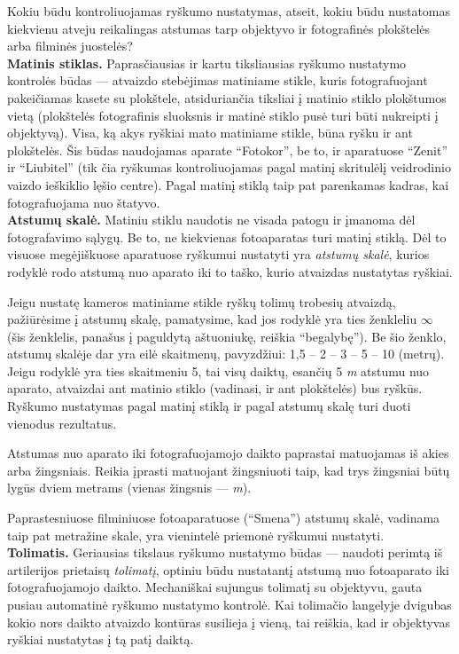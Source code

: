 \documentclass[12pt]{book}
\begin{document}
					Kokiu būdu kontroliuojamas ryškumo nustatymas, atseit, kokiu būdu nustatomas kiekvienu atveju reikalingas atstumas tarp objektyvo ir fotografinės plokštelės arba filminės juostelės?\\

					\textbf{Matinis stiklas.} Paprasčiausias ir kartu tiksliausias ryškumo nustatymo kontrolės būdas --- atvaizdo stebėjimas matiniame stikle, kuris fotografuojant pakeičiamas kasete su plokštele, atsiduriančia tiksliai į matinio stiklo plokštumos vietą (plokštelės fotografinis sluoksnis ir matinė stiklo pusė turi būti nukreipti į objektyvą). Visa, ką akys ryškiai mato matiniame stikle, būna ryšku ir ant plokštelės. Šis būdas naudojamas aparate ``Fotokor'', be to, ir aparatuose ``Zenit'' ir ``Liubitel'' (tik čia ryškumas kontroliuojamas pagal matinį skritulėlį veidrodinio vaizdo ieškiklio lęšio centre). Pagal matinį stiklą taip pat parenkamas kadras, kai fotografuojama nuo štatyvo.\\

					\textbf{Atstumų skalė.} Matiniu stiklu naudotis ne visada patogu ir įmanoma dėl fotografavimo sąlygų. Be to, ne kiekvienas fotoaparatas turi matinį stiklą. Dėl to visuose megėjiškuose aparatuose ryškumui nustatyti yra \textit{atstumų skalė}, kurios rodyklė rodo atstumą nuo aparato iki to taško, kurio atvaizdas nustatytas ryškiai.

					Jeigu nustatę kameros matiniame stikle ryškų tolimų trobesių atvaizdą, pažiūrėsime į atstumų skalę, pamatysime, kad jos rodyklė yra ties ženkleliu $\infty$ (šis ženklelis, panašus į paguldytą aštuoniukę, reiškia ``begalybę''). Be šio ženklo, atstumų skalėje dar yra eilė skaitmenų, pavyzdžiui: 1,5 -- 2 -- 3 -- 5 -- 10 (metrų). Jeigu rodyklė yra ties skaitmeniu 5, tai visų daiktų, esančių 5 \textit{m} atstumu nuo aparato, atvaizdai ant matinio stiklo (vadinasi, ir ant plokštelės) bus ryškūs. Ryškumo nustatymas pagal matinį stiklą ir pagal atstumų skalę turi duoti vienodus rezultatus.

					Atstumas nuo aparato iki fotografuojamojo daikto paprastai matuojamas iš akies arba žingsniais. Reikia įprasti matuojant žingsniuoti taip, kad trys žingsniai būtų lygūs dviem metrams (vienas žingsnis ---  \textit{m}).

					Paprastesniuose filminiuose fotoaparatuose (``Smena'') atstumų skalė, vadinama taip pat metražine skale, yra vienintelė priemonė ryškumui nustatyti.\\

					\textbf{Tolimatis.} Geriausias tikslaus ryškumo nustatymo būdas --- naudoti perimtą iš artilerijos prietaisų \textit{tolimatį}, optiniu būdu nustatantį atstumą nuo fotoaparato iki fotografuojamojo daikto. Mechaniškai sujungus tolimatį su objektyvu, gauta pusiau automatinė ryškumo nustatymo kontrolė. Kai tolimačio langelyje dvigubas kokio nors daikto atvaizdo kontūras susilieja į vieną, tai reiškia, kad ir objektyvas ryškiai nustatytas į tą patį daiktą.
\end{document}
